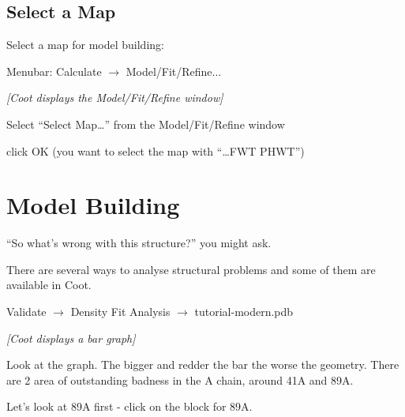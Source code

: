\documentclass{article}
\begin{document}
\subsection{Select a Map}
Select a map for model building:

\begin{trivlist}

\item Menubar: \textsf{Calculate $\rightarrow$ Model/Fit/Refine...}

\textsl{ [Coot displays the Model/Fit/Refine window]}

\item Select \textsf{``Select Map\ldots''} from the Model/Fit/Refine
  window

\item click OK (you want to select the map with ``\ldots FWT PHWT'')
  
\end{trivlist}



\section{Model Building}

``So what's wrong with this structure?'' you might ask.

There are several ways to analyse structural problems and some of them
are available in Coot.

\begin{trivlist}
\item \textsf{Validate $\rightarrow$ Density Fit Analysis $\rightarrow$ tutorial-modern.pdb}

\textsl{ [Coot displays a bar graph]}

\item Look at the graph.  The bigger and redder the bar the worse the
  geometry. There are 2 area of outstanding badness in the A chain,
  around 41A and 89A.
\item Let's look at 89A first - click on the block for 89A.
\end{trivlist}
\end{document}
